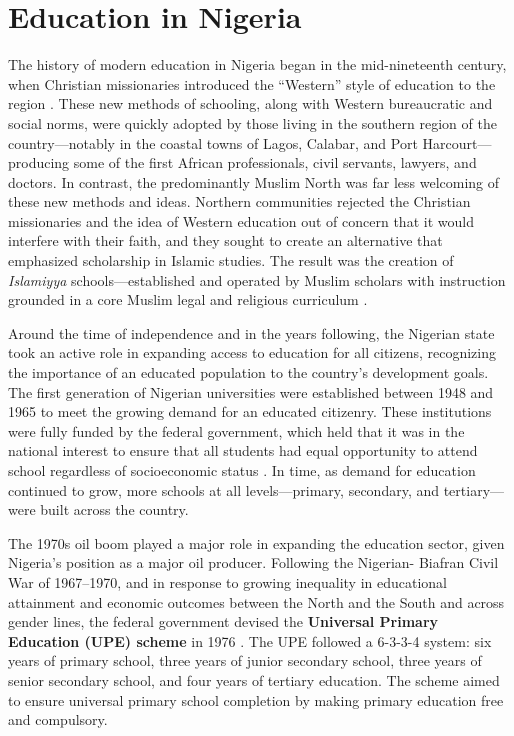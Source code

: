 
\section{Education in Nigeria}
\label{sec:background}

The history of modern education in Nigeria began in the mid-nineteenth
century, when Christian missionaries introduced the ``Western'' style of
education to the region \citep{nigeria_education_factsheet}. These new
methods of schooling, along with Western bureaucratic and social norms,
were quickly adopted by those living in the southern region of the
country---notably in the coastal towns of Lagos, Calabar, and Port
Harcourt---producing some of the first African professionals, civil
servants, lawyers, and doctors. In contrast, the predominantly Muslim
North was far less welcoming of these new methods and ideas. Northern
communities rejected the Christian missionaries and the idea of Western
education out of concern that it would interfere with their faith, and
they sought to create an alternative that emphasized scholarship in
Islamic studies. The result was the creation of \emph{Islamiyya}
schools---established and operated by Muslim scholars with instruction
grounded in a core Muslim legal and religious curriculum
\citep{umar2003}.

Around the time of independence and in the years following, the Nigerian
state took an active role in expanding access to education for all
citizens, recognizing the importance of an educated population to the
country's development goals. The first generation of Nigerian universities
were established between 1948 and 1965 to meet the growing demand for an
educated citizenry. These institutions were fully funded by the federal
government, which held that it was in the national interest to ensure
that all students had equal opportunity to attend school regardless of
socioeconomic status \citep{babsfafunwa1992}. In time, as demand for
education continued to grow, more schools at all levels---primary,
secondary, and tertiary---were built across the country.

The 1970s oil boom played a major role in expanding the education sector,
given Nigeria's position as a major oil producer. Following the Nigerian-
Biafran Civil War of 1967--1970, and in response to growing inequality in
educational attainment and economic outcomes between the North and the
South and across gender lines, the federal government devised the
\textbf{Universal Primary Education (UPE) scheme} in 1976
\citep{csapo1983}. The UPE followed a 6-3-3-4 system: six years of
primary school, three years of junior secondary school, three years of
senior secondary school, and four years of tertiary education. The scheme
aimed to ensure universal primary school completion by making primary
education free and compulsory.

